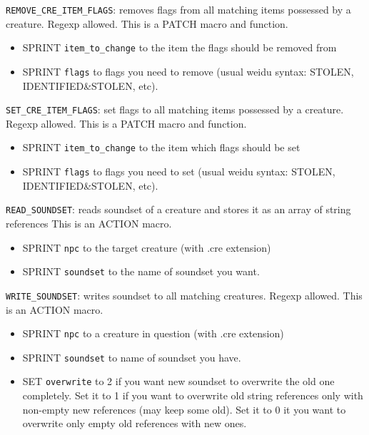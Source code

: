 \documentclass{article}
\begin{document}
\verb+REMOVE_CRE_ITEM_FLAGS+: removes flags from all matching items possessed by a creature. Regexp allowed.
This is a PATCH macro and function.
\begin{itemize}
\item SPRINT \verb+item_to_change+ to the item the flags should be removed from
\item SPRINT \verb+flags+ to flags you need to remove (usual weidu syntax: STOLEN, IDENTIFIED&STOLEN, etc).
\end{itemize}

\verb+SET_CRE_ITEM_FLAGS+: set flags to all matching items possessed by a creature. Regexp allowed.
This is a PATCH macro and function.
\begin{itemize}
\item SPRINT \verb+item_to_change+ to the item which flags should be set
\item SPRINT \verb+flags+ to flags you need to set (usual weidu syntax: STOLEN, IDENTIFIED&STOLEN, etc).
\end{itemize}

\verb+READ_SOUNDSET+: reads soundset of a creature and stores it as an array of string references %
This is an ACTION macro.
\begin{itemize}
\item SPRINT \verb+npc+ to the target creature (with .cre extension)
\item SPRINT \verb+soundset+ to the name of soundset you want.
\end{itemize}

\verb+WRITE_SOUNDSET+: writes soundset to all matching creatures. Regexp allowed.
This is an ACTION macro.
\begin{itemize}
\item SPRINT \verb+npc+ to a creature in question (with .cre extension)
\item SPRINT \verb+soundset+ to name of soundset you have.
\item SET \verb+overwrite+ to 2 if you want new soundset to overwrite the old one completely. Set it to 1 if you want to overwrite old string references only with non-empty new references (may keep some old). Set it to 0 it you want to overwrite only empty old references with new ones.
\end{itemize}
\end{document}
